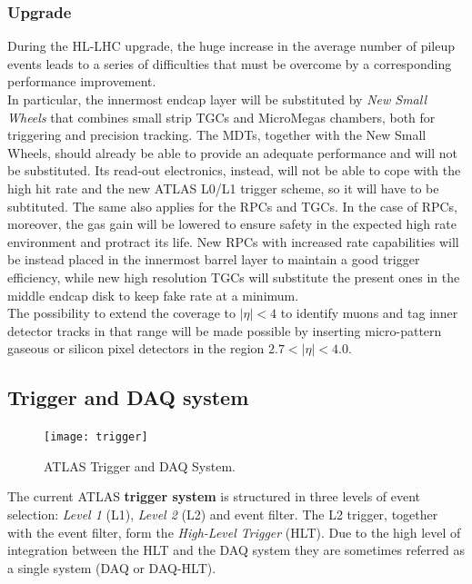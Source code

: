 \documentclass[a4paper,12pt]{article}
\begin{document}
\subsubsection{Upgrade}\cite{scoping}
During the HL-LHC upgrade, the huge increase in the average number of pileup events leads to a series of difficulties that must be overcome by a corresponding performance improvement.\\

In particular, the innermost endcap layer will be substituted by \textit{New Small Wheels} that combines small strip TGCs and MicroMegas chambers, both for triggering and 
precision tracking. The MDTs, together with the New Small Wheels, should already be able to provide an adequate performance and will not be substituted. Its read-out electronics, instead, will not 
be able to cope with the high hit rate and the new ATLAS L0/L1 trigger scheme, so it will have to be subtituted. The same also applies for the RPCs and TGCs. In the case of RPCs, moreover,
the gas gain will be lowered to ensure safety in the expected high rate environment and protract its life. New RPCs with increased rate capabilities will be instead placed in the innermost barrel layer to maintain a
good trigger efficiency, while new high resolution TGCs will substitute the present ones in the middle endcap disk to keep fake rate at a minimum.\\

The possibility to extend the coverage to $|\eta| < 4$ to identify muons and tag inner detector tracks in that range will be made possible by inserting micro-pattern gaseous or silicon pixel
detectors in the region $2.7 < |\eta| < 4.0$.

\subsection{Trigger and DAQ system}

\begin{figure} [h]
	\centering
	\texttt{[image: trigger]}
	\caption{ATLAS Trigger and DAQ System\cite{Green:2010zza}.}
	\label{fig:trigger}
\end{figure}

The current ATLAS \textbf{trigger system} is structured in three levels of event selection: \textit{Level 1} (L1), \textit{Level 2} (L2) and event filter\cite{Aad:2008zzm}. The L2 trigger, together
with the event filter, form the \textit{High-Level Trigger} (HLT). Due to the high level of integration between the HLT and the DAQ system they are sometimes referred as a single system (DAQ or 
DAQ-HLT)\cite{Green:2010zza}.\\
\end{document}

